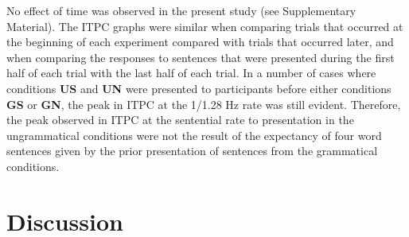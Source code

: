 \documentclass[a4paper,10pt,twoside]{article}
\begin{document}








No effect of time was observed in the present study (see Supplementary Material). The ITPC graphs were similar when comparing trials that occurred at the beginning of each experiment compared with trials that occurred later, and when comparing the responses to sentences that were presented during the first half of each trial with the last half of each trial. In a number of cases where conditions \textbf{US} and \textbf{UN} were presented to participants before either conditions \textbf{GS} or \textbf{GN}, the peak in ITPC at the 1/1.28 Hz rate was still evident. Therefore, the peak observed in ITPC at the sentential rate to presentation in the ungrammatical conditions were not the result of the expectancy of four word sentences given by the prior presentation of sentences from the grammatical conditions. 







\section*{Discussion}

\end{document}
